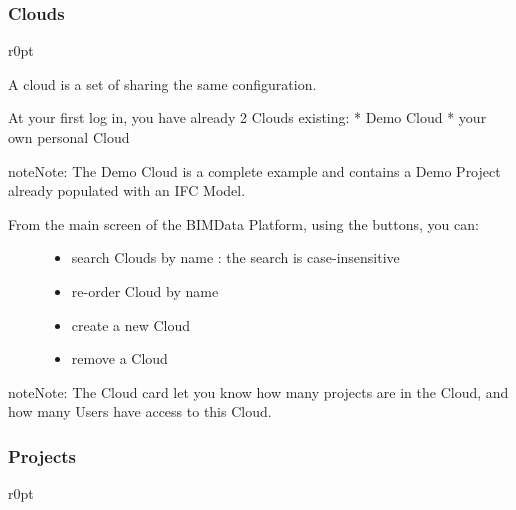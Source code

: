 \documentclass[a4paper,12pt,english]{sphinxmanual}
\begin{document}
\subsubsection{Clouds}
\label{\detokenize{platform/organize:clouds}}\begin{wrapfigure}{r}{0pt}
\centering
\noindent{}
\end{wrapfigure}

A cloud is a set of  sharing the same configuration.

At your first log in, you have already 2 Clouds existing:
* Demo Cloud
* your own personal Cloud

\begin{sphinxadmonition}{note}{Note:}
The Demo Cloud is a complete example and contains a Demo Project already populated with an IFC Model.
\end{sphinxadmonition}
\begin{description}
\item[{From the main screen of the BIMData Platform, using the buttons, you can:}] \leavevmode\begin{itemize}
\item {} 
search Clouds by name : the search is case-insensitive

\item {} 
re-order Cloud by name

\item {} 
create a new Cloud

\item {} 
remove a Cloud

\end{itemize}

\end{description}

\begin{sphinxadmonition}{note}{Note:}
The Cloud card let you know how many projects are in the Cloud, and how many Users have access to this Cloud.
\end{sphinxadmonition}


\subsubsection{Projects}
\label{\detokenize{platform/organize:projects}}\begin{wrapfigure}{r}{0pt}
\centering
\noindent{}
\end{wrapfigure}
\end{document}
